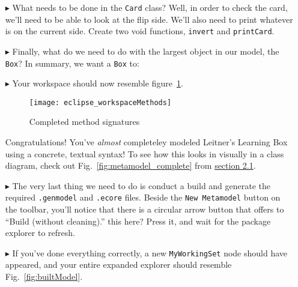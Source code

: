 \begin{itemize}
\item[$\blacktriangleright$] What needs to be done in the \texttt{Card} class? Well, in order to check the card, we'll need to be able to look at the flip side.
We'll also need to print whatever is on the current side. Create two void functions, \texttt{invert} and \texttt{printCard}.

\vfill
\pagebreak

\item[$\blacktriangleright$] Finally, what do we need to do with the largest object in our model, the \texttt{Box}? In summary, we want a \texttt{Box} to:



\item[$\blacktriangleright$] Your workspace should now resemble figure~\ref{fig:workspaceMethods}.
\begin{figure}[htbp]
	\centering
  \texttt{[image: eclipse\_workspaceMethods]}
	\caption{Completed method signatures}
	\label{fig:workspaceMethods}
\end{figure}


Congratulations! You've \emph{almost} completeley modeled Leitner's Learning Box using a concrete, textual syntax! To see how this looks in visually in a class
diagram, check out Fig.~\ref{fig:metamodel_complete} from \hyperlink{sec:static vis}{section 2.1}.

\item[$\blacktriangleright$]The very last thing we need to do is conduct a build and generate the required \texttt{.genmodel} and \texttt{.ecore} files. Beside
the \texttt{New Metamodel} button on the toolbar, you'll notice that there is a circular arrow button that offers to ``Build (without cleaning).''   %
this here? Press it, and wait for the package explorer to refresh.

\item[$\blacktriangleright$] If you've done everything correctly, a new \texttt{MyWorkingSet} node should have appeared, and your entire expanded explorer
should resemble Fig.~\ref{fig:builtModel}.


\end{itemize}
